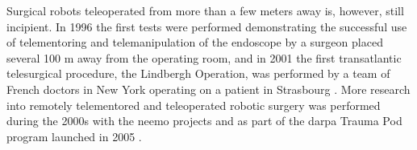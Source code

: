 Surgical robots teleoperated from more than a few meters away is, however, still incipient. In 1996 the first tests were performed demonstrating the successful use of telementoring and telemanipulation of the endoscope by a surgeon placed several 100 m away from the operating room, %
%
%
and in 2001 the first transatlantic telesurgical procedure, the Lindbergh Operation, was performed by a team of French doctors in New York %
operating on a patient in Strasbourg \citep{bib:telesurg_history}. More research into remotely telementored and teleoperated robotic surgery was performed during the 2000s with the \gls{neemo} projects  %
%
and as part of the \gls{darpa} Trauma Pod program launched in 2005 \citep{bib:surgical_book,bib:docatadist}.




%
%

